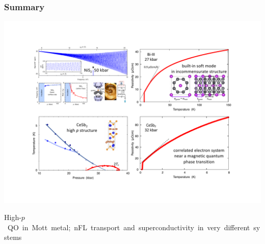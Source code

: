 

\begin{emptyframe}
\frametitle{Summary}
\centerline{\includegraphics[width=\columnwidth]{EndingPicture3.pdf}}
\mbox{\small High-$p$ QO in Mott metal; nFL transport and superconductivity in very different systems}




\end{emptyframe}
{}

